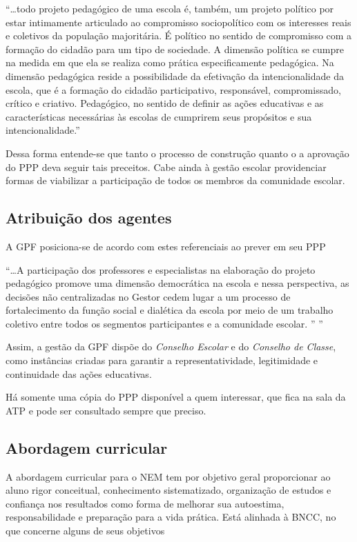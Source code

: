 \begin{citacao}
    ``\ldots todo projeto pedagógico de uma escola é, também, um projeto político por estar intimamente articulado ao compromisso sociopolítico com os interesses reais e coletivos da população majoritária. É político no sentido de compromisso com a formação do cidadão para um tipo de sociedade. A dimensão política se cumpre na medida em que ela se realiza como prática especificamente pedagógica. Na dimensão pedagógica reside a possibilidade da efetivação da intencionalidade da escola, que é a formação do cidadão participativo, responsável, compromissado, crítico e criativo. Pedagógico, no sentido de definir as ações educativas e as características necessárias às escolas de cumprirem seus propósitos e sua intencionalidade.'' 
\end{citacao}
Dessa forma entende-se que tanto o processo de construção quanto o a aprovação do \ac{PPP} deva seguir tais preceitos. Cabe ainda à gestão escolar providenciar formas de viabilizar a participação de todos os membros da comunidade escolar. 

\subsection{Atribuição dos agentes}
A \ac{GPF} posiciona-se de acordo com estes referenciais ao prever em seu \ac{PPP}

\begin{citacao}
    ``\ldots A participação dos professores e especialistas na elaboração do projeto pedagógico promove uma dimensão democrática na escola e nessa perspectiva, as decisões não centralizadas no Gestor cedem lugar a um processo de fortalecimento da função social e dialética da escola por meio de um trabalho coletivo entre todos os segmentos participantes e a comunidade escolar. '' \cite[p. ~5]{GPFPPP:2021}''
\end{citacao}
Assim, a gestão da \ac{GPF} dispõe do \emph{Conselho Escolar} e do \emph{Conselho de Classe}, como instâncias criadas para garantir a representatividade, legitimidade e continuidade das ações educativas.

Há somente uma cópia do \ac{PPP} disponível a quem interessar, que fica na sala da \ac{ATP} e pode ser consultado sempre que preciso.

\subsection{Abordagem curricular}
A abordagem curricular para o \ac{NEM} tem por objetivo geral proporcionar ao aluno rigor conceitual, conhecimento sistematizado, organização de estudos e confiança nos resultados como forma de melhorar sua autoestima, responsabilidade e preparação para a vida prática. Está alinhada à BNCC, no que concerne alguns de seus objetivos

